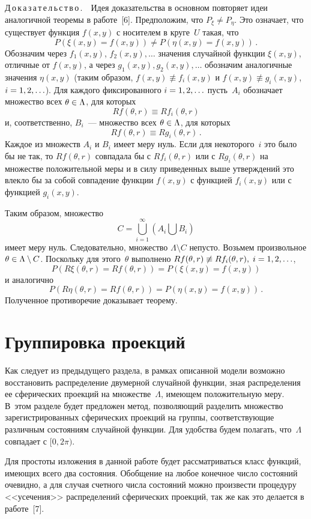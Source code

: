 \begin{multicols}{2}
\noindent
Д\,о\,к\,а\,з\,а\,т\,е\,л\,ь\,с\,т\,в\,о\,.\ \ Идея доказательства в основном повторяет идеи
аналогичной теоремы в работе~[6]. Предположим, что
$P_\xi\not=P_\eta$. Это означает, что существует функция $f(x,y)$ с
носителем в круге~$U$ такая, что
$$
P(\xi(x,y)=f(x,y))\not=P(\eta(x,y)=f(x,y))\,.
$$
Обозначим через $f_1(x,y)$, $f_2(x,y),\ldots$ значения случайной функции $\xi(x,y)$,
отличные от $f(x,y)$, а через
$g_1(x,y),g_2(x,y),\ldots$ обозначим аналогичные значения $\eta(x,y)$ (таким образом, 
$f(x,y)\not\equiv f_i(x,y)$ и
$f(x,y)\not\equiv g_i(x,y)$, $i\hm=1,2,\ldots$). Для каждого фиксированного
$i\hm=1,2,\ldots$ пусть~$A_i$ обозначает множество всех
$\theta\hm\in\Lambda$, для которых
$$
Rf(\theta,r)\equiv Rf_i(\theta,r)
$$
и, соответственно, $B_i$~--- множество всех $\theta\hm\in\Lambda$, для которых
$$
Rf(\theta,r)\equiv Rg_i(\theta,r)\,.
$$
Каждое из множеств $A_i$ и $B_i$ имеет меру нуль. Если для некоторого~$i$
это было бы не так, то $Rf(\theta,r)$ совпадала бы с $Rf_i(\theta,r)$ или 
с $Rg_i(\theta,r)$ на множестве
положительной меры и в силу приведенных выше утверждений это влекло бы за
собой совпадение функции $f(x,y)$ с функцией $f_i(x,y)$ или с функцией $g_i(x,y)$.

Таким образом, множество
$$
C=\bigcup\limits_{i=1}^{\infty}\left(A_i\bigcup\limits B_i\right)
$$
имеет меру нуль. Следовательно, множество $\Lambda\setminus C$
непусто. Возьмем произвольное $\theta\hm\in\Lambda\setminus C$.
Поскольку для этого~$\theta$ выполнено $Rf(\theta,r)\not\equiv
Rf_i(\theta,r),\;i\hm=1,2,\ldots$,
$$
P(R\xi(\theta,r)=Rf(\theta,r))=P(\xi(x,y)=f(x,y))
$$ 
и аналогично
$$
P(R\eta(\theta,r)=Rf(\theta,r))=P(\eta(x,y)=f(x,y))\,.
$$
Полученное противоречие доказывает теорему.

\section{Группировка проекций}

Как следует из предыдущего раздела, в рамках описанной модели
возможно восстановить распределение двумерной случайной функции,
зная распределения ее сферических проекций на множестве~$\Lambda$,
имеющем положительную меру. В~этом разде\-ле будет предложен метод,
позволяющий разделить множество зарегистрированных сферических
проекций на группы, соответствующие различным состояниям случайной
функции. Для \mbox{удобства} будем полагать, что~$\Lambda$ совпадает с
$[0,2\pi)$.


Для простоты изложения в данной работе будет рассматриваться класс
функций, имеющих всего два состояния. Обобщение на любое конечное
число состояний очевидно, а для случая счетного числа состояний
можно произвести процедуру <<усечения>> распределений сферических
проекций, так же как это делается в работе~[7].


\end{multicols}

